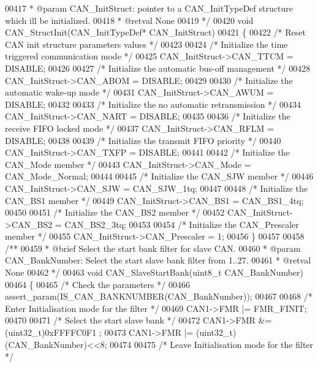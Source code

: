 \begin{DoxyCode}
00417 \textcolor{comment}{  * @param  CAN\_InitStruct: pointer to a CAN\_InitTypeDef structure which ill be initialized.}
00418 \textcolor{comment}{  * @retval None}
00419 \textcolor{comment}{  */}
00420 \textcolor{keywordtype}{void} CAN_StructInit(CAN\_InitTypeDef* CAN\_InitStruct)
00421 \{
00422   \textcolor{comment}{/* Reset CAN init structure parameters values */}
00423 
00424   \textcolor{comment}{/* Initialize the time triggered communication mode */}
00425   CAN\_InitStruct->CAN_TTCM = DISABLE;
00426 
00427   \textcolor{comment}{/* Initialize the automatic bus-off management */}
00428   CAN\_InitStruct->CAN_ABOM = DISABLE;
00429 
00430   \textcolor{comment}{/* Initialize the automatic wake-up mode */}
00431   CAN\_InitStruct->CAN_AWUM = DISABLE;
00432 
00433   \textcolor{comment}{/* Initialize the no automatic retransmission */}
00434   CAN\_InitStruct->CAN_NART = DISABLE;
00435 
00436   \textcolor{comment}{/* Initialize the receive FIFO locked mode */}
00437   CAN\_InitStruct->CAN_RFLM = DISABLE;
00438 
00439   \textcolor{comment}{/* Initialize the transmit FIFO priority */}
00440   CAN\_InitStruct->CAN_TXFP = DISABLE;
00441 
00442   \textcolor{comment}{/* Initialize the CAN\_Mode member */}
00443   CAN\_InitStruct->CAN_Mode = CAN_Mode_Normal;
00444 
00445   \textcolor{comment}{/* Initialize the CAN\_SJW member */}
00446   CAN\_InitStruct->CAN_SJW = CAN_SJW_1tq;
00447 
00448   \textcolor{comment}{/* Initialize the CAN\_BS1 member */}
00449   CAN\_InitStruct->CAN_BS1 = CAN_BS1_4tq;
00450 
00451   \textcolor{comment}{/* Initialize the CAN\_BS2 member */}
00452   CAN\_InitStruct->CAN_BS2 = CAN_BS2_3tq;
00453 
00454   \textcolor{comment}{/* Initialize the CAN\_Prescaler member */}
00455   CAN\_InitStruct->CAN_Prescaler = 1;
00456 \}
00457 
00458 \textcolor{comment}{/**}
00459 \textcolor{comment}{  * @brief  Select the start bank filter for slave CAN.}
00460 \textcolor{comment}{  * @param  CAN\_BankNumber: Select the start slave bank filter from 1..27.}
00461 \textcolor{comment}{  * @retval None}
00462 \textcolor{comment}{  */}
00463 \textcolor{keywordtype}{void} CAN_SlaveStartBank(uint8\_t CAN\_BankNumber)
00464 \{
00465   \textcolor{comment}{/* Check the parameters */}
00466   assert_param(IS\_CAN\_BANKNUMBER(CAN\_BankNumber));
00467 
00468   \textcolor{comment}{/* Enter Initialisation mode for the filter */}
00469   CAN1->FMR |= FMR_FINIT;
00470 
00471   \textcolor{comment}{/* Select the start slave bank */}
00472   CAN1->FMR &= (uint32\_t)0xFFFFC0F1 ;
00473   CAN1->FMR |= (uint32\_t)(CAN\_BankNumber)<<8;
00474 
00475   \textcolor{comment}{/* Leave Initialisation mode for the filter */}

\end{DoxyCode}
